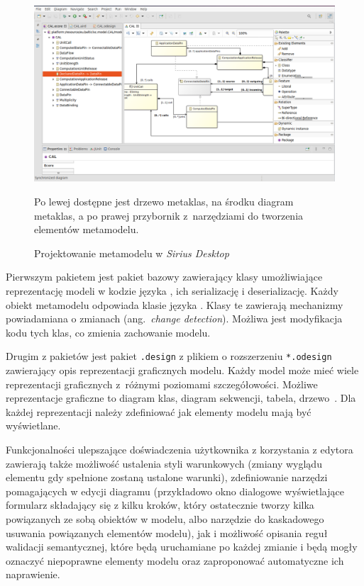 \begin{figure}[!ht]
	\centering

	\includegraphics[width=0.95\linewidth]{./images/sirius-desktop-metamodel.png}
	\caption{Projektowanie metamodelu w \emph{Sirius
			Desktop}}\label{rys:sirius-desktop-example-metamodel}
	\medskip
	{\small Po lewej dostępne jest drzewo metaklas, na środku diagram
		metaklas, a po prawej przybornik z~narzędziami do tworzenia
		elementów metamodelu.}
\end{figure}

Pierwszym pakietem jest pakiet bazowy zawierający klasy umożliwiające
reprezentację modeli w
kodzie języka \Java{}, ich serializację i deserializację. Każdy obiekt
metamodelu
odpowiada klasie języka \Java{}. Klasy te zawierają mechanizmy powiadamiana o
zmianach (ang.~\emph{change detection}).
Możliwa jest modyfikacja kodu tych klas, co zmienia zachowanie
modelu.

Drugim z pakietów jest pakiet \texttt{.design} z plikiem o rozszerzeniu
\texttt{*.odesign} zawierający opis reprezentacji graficznych modelu. Każdy
model może mieć wiele reprezentacji graficznych z~różnymi poziomami
szczegółowości.
Możliwe reprezentacje graficzne to diagram klas, diagram
sekwencji, tabela, drzewo~\cite{dokumentacja-sirius-desktop}. Dla każdej
reprezentacji należy zdefiniować jak elementy modelu mają być wyświetlane.

Funkcjonalności ulepszające doświadczenia użytkownika z
korzystania z edytora zawierają także możliwość ustalenia styli warunkowych
(zmiany wyglądu elementu gdy spełnione zostaną ustalone warunki), zdefiniowanie
narzędzi pomagających w edycji diagramu (przykładowo okno dialogowe
wyświetlające formularz składający się z kilku kroków, który ostatecznie tworzy
kilka powiązanych ze sobą obiektów w modelu, albo narzędzie do kaskadowego
usuwania powiązanych elementów modelu), jak i możliwość opisania reguł
walidacji semantycznej, które będą uruchamiane po każdej zmianie i będą mogły
oznaczyć niepoprawne elementy modelu oraz zaproponować automatyczne ich
naprawienie.

